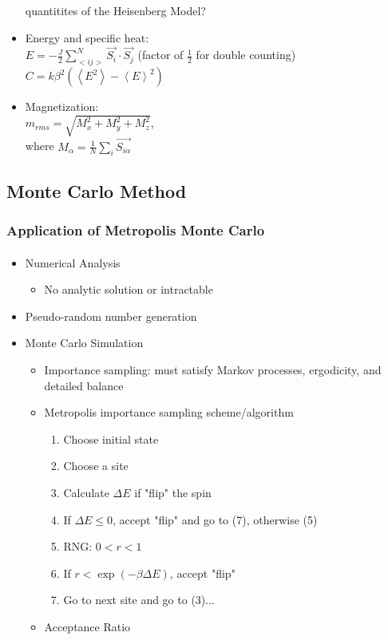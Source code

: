 \documentclass{beamer}
\begin{document}
\begin{frame}
\begin{itemize}
quantitites of the Heisenberg Model?
      \item Energy and specific heat:\\
      			$\displaystyle E = -\frac{J}{2}\sum_{<ij>}^{N}\vec{S_i}\cdot\vec{S_j}$ (factor of $\frac{1}{2}$ for double counting) \\
      			$\displaystyle C = k\beta^2(\left< E^2 \right> - \left< E \right>^2)$ \\
    	\item Magnetization: \\
    				$\displaystyle m_{rms} = \sqrt{M_x^2 + M_y^2 + M_z^2}$,\\
    				 where $\displaystyle M_\alpha = \frac{1}{N}\sum_i{\vec{S_{i\alpha}}}$
    	
    \end{itemize}
  \end{frame}
  \subsection{Monte Carlo Method}
  \begin{frame}
    \frametitle{Application of Metropolis Monte Carlo}
    \framesubtitle{}
    \begin{itemize}
    	\item Numerical Analysis
    	\begin{itemize}
    		\item No analytic solution or intractable
    	\end{itemize}
    	\item Pseudo-random number generation
    	\item Monte Carlo Simulation
    	\begin{itemize}
    		\item Importance sampling: must satisfy Markov processes, ergodicity, and detailed balance
    		\item Metropolis importance sampling scheme/algorithm
    		\begin{enumerate}
    			\item Choose initial state
    			\item Choose a site
    			\item Calculate $\Delta E$ if "flip" the spin
    			\item If $\Delta E \le 0$, accept "flip" and go to (7), otherwise (5)
    			\item RNG: $0 < r < 1$
    			\item If $r < \exp(-\beta \Delta E)$, accept "flip"
    			\item Go to next site and go to (3)...
    		\end{enumerate}
    		\item Acceptance Ratio
    	\end{itemize}
    \end{itemize}
  \end{frame}
\end{document}
